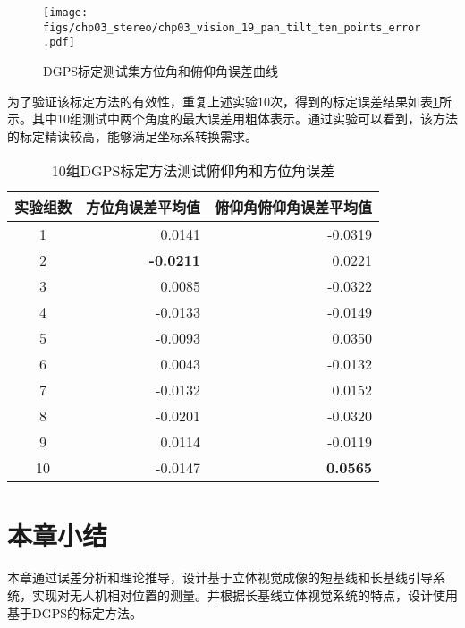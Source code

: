 \begin{figure}[htb]
	\centering
	\texttt{[image: figs/chp03\_stereo/chp03\_vision\_19\_pan\_tilt\_ten\_points\_error.pdf]}	
	\caption{DGPS标定测试集方位角和俯仰角误差曲线}
	\label{fig:chp03_vision_19_pan_tilt_ten_points_error}
\end{figure}

为了验证该标定方法的有效性，重复上述实验10次，得到的标定误差结果如表\ref{label:DGPS_10_Test_Results}所示。其中10组测试中两个角度的最大误差用粗体表示。通过实验可以看到，该方法的标定精读较高，能够满足坐标系转换需求。
\begin{table}[htb]
	\centering
	\caption{10组DGPS标定方法测试俯仰角和方位角误差}
	\label{label:DGPS_10_Test_Results}
	\begin{tabular}{crr}
		\hline
		实验组数 & \multicolumn{1}{c}{方位角误差平均值} & \multicolumn{1}{c}{俯仰角俯仰角误差平均值} \\ \hline
		1    & 0.0141                       & -0.0319                         \\
		2    & \textbf{-0.0211}             & 0.0221                          \\
		3    & 0.0085                       & -0.0322                \\
		4    & -0.0133                      & -0.0149                         \\
		5    & -0.0093                      & 0.0350                          \\
		6    & 0.0043                       & -0.0132                         \\
		7    & -0.0132                      & 0.0152                          \\
		8    & -0.0201                      & -0.0320                         \\
		9    & 0.0114                       & -0.0119                         \\
		10   & -0.0147                      & \textbf{0.0565}                          \\ \hline
	\end{tabular}
\end{table}

\section{本章小结}
本章通过误差分析和理论推导，设计基于立体视觉成像的短基线和长基线引导系统，实现对无人机相对位置的测量。并根据长基线立体视觉系统的特点，设计使用基于DGPS的标定方法。
